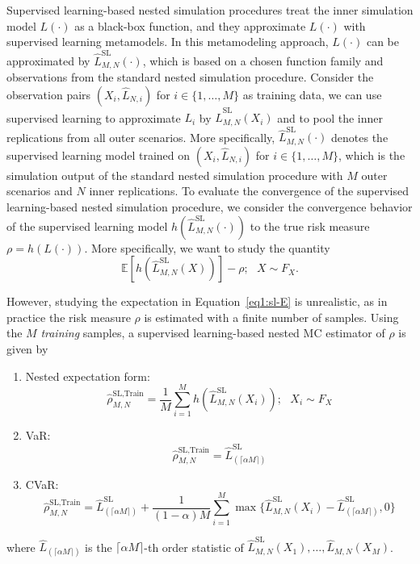 Supervised learning-based nested simulation procedures treat the inner simulation model $L(\cdot)$ as a black-box function, and they approximate $L(\cdot)$ with supervised learning metamodels.
In this metamodeling approach, $L(\cdot)$ can be approximated by $\hat{L}^{\text{SL}}_{M, N}(\cdot)$, which is based on a chosen function family and observations from the standard nested simulation procedure.
Consider the observation pairs $(X_i, \hat{L}_{N, i})$ for $i \in \{1, \dots, M\}$ as training data, we can use supervised learning to approximate $L_i$ by $\hat{L}_{M, N}^{\text{SL}}(X_i)$ and to pool the inner replications from all outer scenarios.
More specifically, $\hat{L}^{\text{SL}}_{M, N}(\cdot)$ denotes the supervised learning model trained on $(X_i, \hat{L}_{N, i})$ for $i \in \{1, \dots, M\}$, which is the simulation output of the standard nested simulation procedure with $M$ outer scenarios and $N$ inner replications. 
To evaluate the convergence of the supervised learning-based nested simulation procedure, we consider the convergence behavior of the supervised learning model $h(\hat{L}^{\text{SL}}_{M, N}(\cdot))$ to the true risk measure $\rho = h(L(\cdot))$.
More specifically, we want to study the quantity
\begin{equation} \label{eq1:sl-E}
    \mathbb{E} \left[ h(\hat{L}^{\text{SL}}_{M, N}(X))   \right] - \rho; ~~~ X \sim F_X.
\end{equation}

However, studying the expectation in Equation~\ref{eq1:sl-E} is unrealistic, as in practice the risk measure $\rho$ is estimated with a finite number of samples.
Using the $M$ \textit{training} samples, a supervised learning-based nested MC estimator of $\rho$ is given by

\begin{enumerate}
    \item   Nested expectation form:
            \begin{equation} \label{eq1:sl-train}
                \hat{\rho}^{\text{SL}, \text{Train}}_{M, N} = \frac{1}{M} \sum_{i=1}^M h(\hat{L}^{\text{SL}}_{M, N}(X_i)); ~~~ X_i \sim F_X
            \end{equation}
    \item   VaR:
            $$\hat{\rho}^{\text{SL}, \text{Train}}_{M, N} = \hat{L}^{\text{SL}}_{(\lceil \alpha M \rceil)}$$
    \item   CVaR:
            $$\hat{\rho}^{\text{SL}, \text{Train}}_{M, N} = \hat{L}^{\text{SL}}_{(\lceil \alpha M \rceil)} + \frac{1}{(1-\alpha) M} \sum_{i=1}^M \max \{\hat{L}^{\text{SL}}_{M, N}(X_i) - \hat{L}^{\text{SL}}_{(\lceil \alpha M \rceil)}, 0 \}$$
\end{enumerate}
where $\hat{L}_{(\lceil \alpha M \rceil)}$ is the $\lceil \alpha M \rceil$-th order statistic of $\hat{L}^{\text{SL}}_{M, N}(X_1), \dots, \hat{L}_{M, N}(X_M)$.

